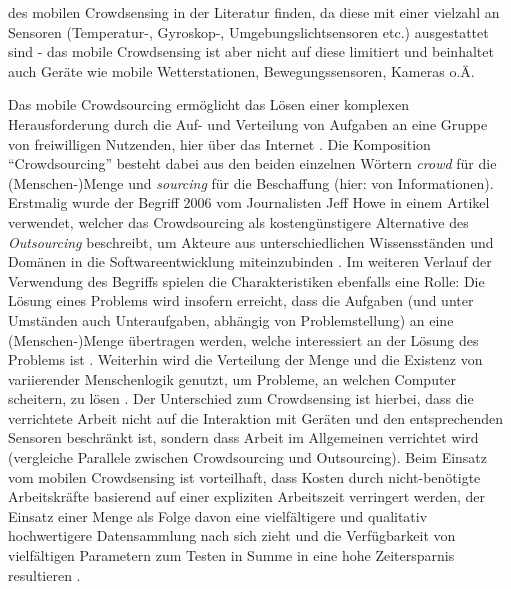 des mobilen Crowdsensing in der Literatur finden, da diese mit einer vielzahl an Sensoren (Temperatur-, Gyroskop-, Umgebungslichtsensoren etc.) ausgestattet sind - das mobile Crowdsensing ist aber nicht auf diese limitiert und beinhaltet auch Geräte wie mobile Wetterstationen, Bewegungssensoren, Kameras o.Ä. 

Das mobile Crowdsourcing ermöglicht das Lösen einer komplexen Herausforderung durch die Auf- und Verteilung von Aufgaben an eine Gruppe von freiwilligen Nutzenden, hier über das Internet \cite {Wang2019}. Die Komposition \enquote{Crowdsourcing} besteht dabei aus den beiden einzelnen Wörtern \textit{crowd} für die (Menschen-)Menge und \textit{sourcing} für die Beschaffung (hier: von Informationen). Erstmalig wurde der Begriff 2006 vom Journalisten Jeff Howe in einem Artikel verwendet, welcher das Crowdsourcing als kostengünstigere Alternative des \textit{Outsourcing} beschreibt, um Akteure aus unterschiedlichen Wissensständen und Domänen in die Softwareentwicklung miteinzubinden \cite{Howe2006}. Im weiteren Verlauf der Verwendung des Begriffs spielen die Charakteristiken ebenfalls eine Rolle: Die Lösung eines Problems wird insofern erreicht, dass die Aufgaben (und unter Umständen auch Unteraufgaben, abhängig von Problemstellung) an eine (Menschen-)Menge übertragen werden, welche interessiert an der Lösung des Problems ist \cite{Ray2022}. Weiterhin wird die Verteilung der Menge und die Existenz von variierender Menschenlogik genutzt, um Probleme, an welchen Computer scheitern, zu lösen \cite{Ray2022}. Der Unterschied zum Crowdsensing ist hierbei, dass die verrichtete Arbeit nicht auf die Interaktion mit Geräten und den entsprechenden Sensoren beschränkt ist, sondern dass Arbeit im Allgemeinen verrichtet wird (vergleiche Parallele zwischen Crowdsourcing und Outsourcing).
Beim Einsatz vom mobilen Crowdsensing ist vorteilhaft, dass Kosten durch nicht-benötigte Arbeitskräfte basierend auf einer expliziten Arbeitszeit verringert werden, der Einsatz einer Menge als Folge davon eine vielfältigere und qualitativ hochwertigere Datensammlung nach sich zieht und die Verfügbarkeit von vielfältigen Parametern zum Testen in Summe in eine hohe Zeitersparnis resultieren \cite{Ray2022}.


